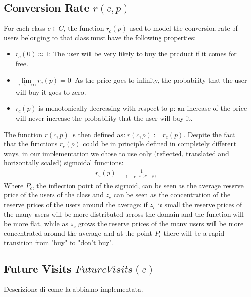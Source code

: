 \documentclass[11pt]{article} %
\begin{document}
\subsection{Conversion Rate $r(c,p)$}
For each class $c \in C$, the function $r_c(p)$ used to model the conversion rate of users belonging to that class must have the following properties:
\begin{itemize}
\item $r_c(0) \approx 1$: The user will be very likely to buy the product if it comes for free.
\item $\lim\limits_{p \to +\infty} r_c(p) = 0$: As the price goes to infinity, the probability that the user will buy it goes to zero.
\item $r_c(p)$ is monotonically decreasing with respect to p: an increase of the price will never increase the probability that the user will buy it.
\end{itemize}
The function $r(c,p)$ is then defined as: $r(c,p) := r_c(p)$.
Despite the fact that the functions $r_c(p)$ could be in principle defined in completely different ways, in our implementation we chose to use only (reflected, translated and horizontally scaled) sigmoidal functions:
\begin{align*}
r_c(p) = \frac{1}{1+e^{-z_c(P_c-p)}}
\end{align*}
Where $P_c$, the inflection point of the sigmoid, can be seen as the average reserve price of the users of the class and $z_c$ can be seen as the concentration of the reserve prices of the users around the average: if $z_c$ is small the reserve prices of the many users will be more distributed across the domain and the function will be more flat, while as $z_c$ grows the reserve prices of the many users will be more concentrated around the average and at the point $P_c$ there will be a rapid transition from "buy" to "don't buy".
\subsection{Future Visits $FutureVisits(c)$}
{\color{red}Descrizione di come la abbiamo implementata.}
\end{document}
